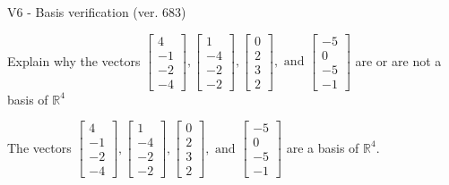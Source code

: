 \begin{exercise}
  \begin{exerciseTitle}V6 - Basis verification (ver. 683)\end{exerciseTitle}
  \begin{exerciseStatement}
    Explain why the vectors \(\left[\begin{array}{r}
4 \\
-1 \\
-2 \\
-4
\end{array}\right] , \left[\begin{array}{r}
1 \\
-4 \\
-2 \\
-2
\end{array}\right] , \left[\begin{array}{r}
0 \\
2 \\
3 \\
2
\end{array}\right] , \text{ and } \left[\begin{array}{r}
-5 \\
0 \\
-5 \\
-1
\end{array}\right]\) are or are not a basis of \(\mathbb{R}^4\)	


  \end{exerciseStatement}
  \begin{exerciseAnswer}
   The vectors \(\left[\begin{array}{r}
4 \\
-1 \\
-2 \\
-4
\end{array}\right] , \left[\begin{array}{r}
1 \\
-4 \\
-2 \\
-2
\end{array}\right] , \left[\begin{array}{r}
0 \\
2 \\
3 \\
2
\end{array}\right] , \text{ and } \left[\begin{array}{r}
-5 \\
0 \\
-5 \\
-1
\end{array}\right]\) 
  	 are  a basis of \(\mathbb{R}^4\).
  


  \end{exerciseAnswer}
\end{exercise}